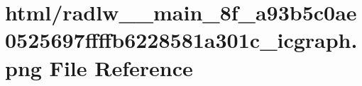 \hypertarget{radlw____main__8f__a93b5c0ae0525697ffffb6228581a301c__icgraph_8png}{}\section{html/radlw\+\_\+\+\_\+main\+\_\+8f\+\_\+a93b5c0ae0525697ffffb6228581a301c\+\_\+icgraph.png File Reference}
\label{radlw____main__8f__a93b5c0ae0525697ffffb6228581a301c__icgraph_8png}
